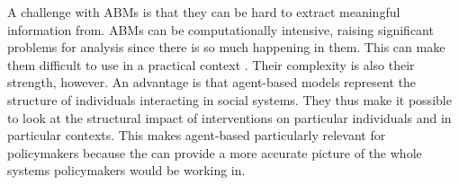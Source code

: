 

A challenge with ABMs is that they can be hard to extract meaningful information from. ABMs can be computationally intensive, raising significant problems for analysis since there is so much happening in them. This can make them difficult to use in a practical context \cite{banksStatisticalChallengesAgentBased2021}. %
% 
Their complexity is also their strength, however. An advantage is that agent-based models represent the structure of individuals interacting in social systems. %
They thus make it possible to look at the structural impact of interventions on particular  individuals and in particular contexts. This makes agent-based particularly relevant for policymakers because the can provide a more accurate picture of the whole systems policymakers would be working in.




